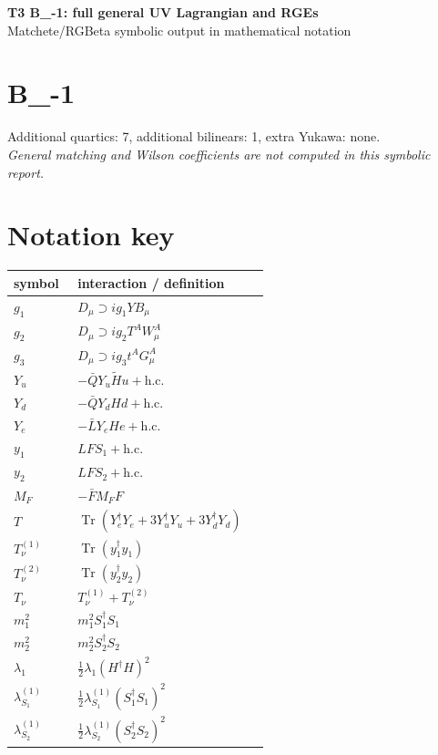 \documentclass[10pt,a4paper]{article}
\begin{document}
\begin{center}
{\Large\bfseries T3 B\_-1: full general UV Lagrangian and RGEs}\\[4pt]
Matchete/RGBeta symbolic output in mathematical notation
\end{center}
\bigskip
\section*{B\_-1}
Additional quartics: 7, additional bilinears: 1, extra Yukawa: none.\\
\emph{General matching and Wilson coefficients are not computed in this symbolic report.}
\section*{Notation key}
\begin{longtable}{@{}p{0.23\linewidth}p{0.69\linewidth}@{}}
\toprule
symbol & interaction / definition \\
\midrule
$g_1$ & $D_\mu\supset i g_1YB_\mu$ \\
$g_2$ & $D_\mu\supset i g_2T^AW_\mu^A$ \\
$g_3$ & $D_\mu\supset i g_3t^AG_\mu^A$ \\
$Y_u$ & $-\bar QY_u\widetilde Hu+\mathrm{h.c.}$ \\
$Y_d$ & $-\bar QY_dHd+\mathrm{h.c.}$ \\
$Y_e$ & $-\bar LY_eHe+\mathrm{h.c.}$ \\
$y_1$ & $LFS_1+\mathrm{h.c.}$ \\
$y_2$ & $LFS_2+\mathrm{h.c.}$ \\
$M_F$ & $-\bar FM_FF$ \\
$T$ & $\operatorname{Tr}(Y_e^\dagger Y_e+3Y_u^\dagger Y_u+3Y_d^\dagger Y_d)$ \\
$T_\nu^{(1)}$ & $\operatorname{Tr}(y_1^\dagger y_1)$ \\
$T_\nu^{(2)}$ & $\operatorname{Tr}(y_2^\dagger y_2)$ \\
$T_\nu$ & $T_\nu^{(1)}+T_\nu^{(2)}$ \\
$m_1^2$ & $m_1^2S_1^\dagger S_1$ \\
$m_2^2$ & $m_2^2S_2^\dagger S_2$ \\
$\lambda_1$ & $\frac12\lambda_1(H^\dagger H)^2$ \\
$\lambda_{S_1}^{(1)}$ & $\frac12\lambda_{S_1}^{(1)}(S_1^\dagger S_1)^2$ \\
$\lambda_{S_2}^{(1)}$ & $\frac12\lambda_{S_2}^{(1)}(S_2^\dagger S_2)^2$ \\

\end{longtable}
\end{document}
